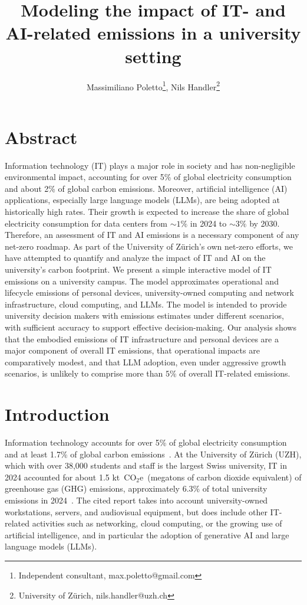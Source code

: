 \documentclass[11pt]{article}
\title{Modeling the impact of IT- and AI-related emissions in a university setting}
\author{Massimiliano Poletto\thanks{Independent consultant, max.poletto@gmail.com}, Nils Handler\thanks{University of Zürich, nils.handler@uzh.ch}}
\newcommand{\coe}{CO$_2$e}
\newcommand{\tcoe}{t~\coe}
\begin{document}
\maketitle

\section*{Abstract}
Information technology (IT) plays a major role in society and has non-negligible environmental impact, accounting for over 5\% of global electricity consumption and about 2\% of global carbon emissions. Moreover, artificial intelligence (AI) applications, especially large language models (LLMs), are being adopted at historically high rates. Their growth is expected to increase the share of global electricity consumption for data centers from $\sim 1\%$ in 2024 to $\sim 3\%$ by 2030. Therefore, an assessment of IT and AI emissions is a necessary component of any net-zero roadmap. As part of the University of Zürich's own net-zero efforts, we have attempted to quantify and analyze the impact of IT and AI on the university's carbon footprint. We present a simple interactive model of IT emissions on a university campus. The model approximates operational and lifecycle emissions of personal devices, university-owned computing and network infrastructure, cloud computing, and LLMs. The model is intended to provide university decision makers with emissions estimates under different scenarios, with sufficient accuracy to support effective decision-making. Our analysis shows that the embodied emissions of IT infrastructure and personal devices are a major component of overall IT emissions, that operational impacts are comparatively modest, and that LLM adoption, even under aggressive growth scenarios, is unlikely to comprise more than $5\%$ of overall IT-related emissions.

\section{Introduction}

Information technology accounts for over 5\% of global electricity consumption and at least 1.7\% of global carbon emissions~\cite{wb:itu:ict}. At the University of Zürich (UZH), which with over 38,000 students and staff is the largest Swiss university, IT in 2024 accounted for about 1.5 k\tcoe\ (megatons of carbon dioxide equivalent) of greenhouse gas (GHG) emissions, approximately 6.3\% of total university emissions in 2024~\cite{uzh:sustainability:report}. The cited report takes into account university-owned workstations, servers, and audiovisual equipment, but does include other IT-related activities such as networking, cloud computing, or the growing use of artificial intelligence, and in particular the adoption of generative AI and large language models (LLMs).
\end{document}
